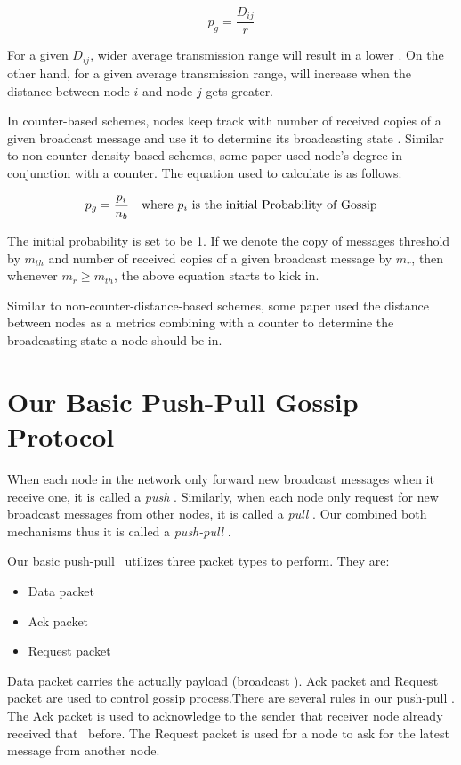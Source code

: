 \[ p_g = \frac{D_{ij}}{r}\]

For a given $D_{ij}$, wider average transmission range will result in a lower \emph{\pog}. On the other hand, for a given average transmission range, \emph{\pog} will increase when the distance between node $i$ and node $j$ gets greater.

In counter-based schemes, nodes keep track with number of received copies of a given broadcast message and use it to determine its broadcasting state \cite{2015survey}. Similar to non-counter-density-based schemes, some paper \cite{lee2010adaptive} used node's degree in conjunction with a counter. The equation used to calculate \emph{\pog} is as follows:

\[ p_g = \frac{p_i}{n_b} \quad \mbox{where } p_i \mbox{ is the initial Probability of Gossip}\]

The initial probability is set to be 1. If we denote the copy of messages threshold by $m_{th}$ and number of received copies of a given broadcast message by $m_r$, then whenever $m_r \geq m_{th}$, the above equation starts to kick in.

Similar to non-counter-distance-based schemes, some paper \cite{khan2008distance}\cite{ling2005coverage} used the distance between nodes as a metrics combining with a counter to determine the broadcasting state a node should be in. 

\section{Our Basic Push-Pull Gossip Protocol} \label{pp}
When each node in the network only forward new broadcast messages when it receive one, it is called a \emph{push} \gp. Similarly, when each node only request for new broadcast messages from other nodes, it is called  a \emph{pull} \gp. Our \gp combined both mechanisms thus it is called a \emph{push-pull} \gp. 

Our basic push-pull \gp ~utilizes three packet types to perform. They are:
\begin{itemize}
	\item Data packet
	\item Ack packet 
	\item Request packet
\end{itemize}

Data packet carries the actually payload (broadcast \msg). Ack packet and Request packet are used to control gossip process.There are several rules in our push-pull \gp. The Ack packet is used to acknowledge to the sender that receiver node already received that \msg ~before. The Request packet is used for a node to ask for the latest message from another node.


